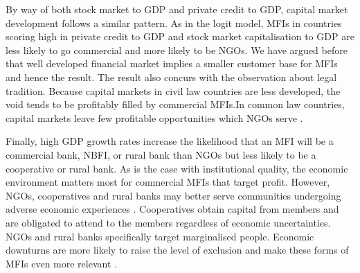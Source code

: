 \documentclass[a4paper,nobind]{templates/ociamthesis}
\begin{document}
By way of both stock market to GDP and private credit to GDP, capital market development follows a similar pattern. As in the logit model, MFIs in countries scoring high in private credit to GDP and stock market capitalisation to GDP are less likely to go commercial and more likely to be NGOs. We have argued before that well developed financial market implies a smaller customer base for MFIs and hence the result. The result also concurs with the observation about legal tradition. Because capital markets in civil law countries are less developed, the void tends to be profitably filled by commercial MFIs.In common law countries, capital markets leave few profitable opportunities which NGOs serve \autocite{d2013unsubsidized,armendariz2013subsidy}.

Finally, high GDP growth rates increase the likelihood that an MFI will be a commercial bank, NBFI, or rural bank than NGOs but less likely to be a cooperative or rural bank. As is the case with institutional quality, the economic environment matters most for commercial MFIs that target profit. However, NGOs, cooperatives and rural banks may better serve communities undergoing adverse economic experiences \autocite{ghosh2013microfinance}. Cooperatives obtain capital from members and are obligated to attend to the members regardless of economic uncertainties. NGOs and rural banks specifically target marginalised people. Economic downturns are more likely to raise the level of exclusion and make these forms of MFIs even more relevant \autocite{schnyder2018twenty}.
\end{document}
